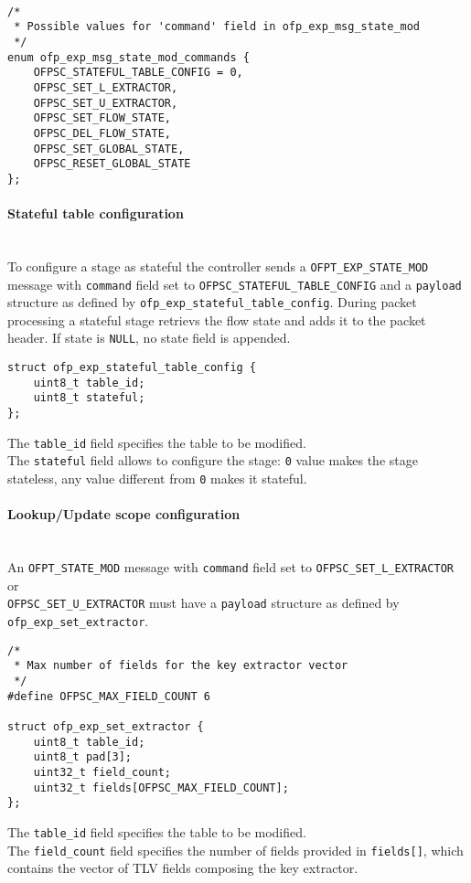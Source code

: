 \scriptsize\begin{verbatim}

/*
 * Possible values for 'command' field in ofp_exp_msg_state_mod
 */
enum ofp_exp_msg_state_mod_commands {
    OFPSC_STATEFUL_TABLE_CONFIG = 0,
    OFPSC_SET_L_EXTRACTOR,
    OFPSC_SET_U_EXTRACTOR,
    OFPSC_SET_FLOW_STATE,   
    OFPSC_DEL_FLOW_STATE,
    OFPSC_SET_GLOBAL_STATE,
    OFPSC_RESET_GLOBAL_STATE   
};
\end{verbatim}\normalsize

\paragraph{Stateful table configuration}\mbox{}\\
To configure a stage as stateful the controller sends a \texttt{OFPT\_EXP\_STATE\_MOD} message with \texttt{command} field set to \texttt{OFPSC\_STATEFUL\_TABLE\_CONFIG} and a \texttt{payload} structure as defined by \texttt{ofp\_exp\_stateful\_table\_config}. During packet processing a stateful stage retrievs the flow state and adds it to the packet header. If state is \texttt{NULL}, no state field is appended.

\scriptsize\begin{verbatim}
struct ofp_exp_stateful_table_config { 
    uint8_t table_id;
    uint8_t stateful;
};
\end{verbatim}\normalsize
The \texttt{table\_id} field specifies the table to be modified.
\\
The \texttt{stateful} field allows to configure the stage: \texttt{0} value makes the stage stateless, any value different from \texttt{0} makes it stateful.

\paragraph{Lookup/Update scope configuration}\mbox{}\\
An \texttt{OFPT\_STATE\_MOD} message with \texttt{command} field set to \texttt{OFPSC\_SET\_L\_EXTRACTOR} or
\\
\texttt{OFPSC\_SET\_U\_EXTRACTOR} must have a \texttt{payload} structure as defined by \texttt{ofp\_exp\_set\_extractor}.

\scriptsize\begin{verbatim}
/*
 * Max number of fields for the key extractor vector
 */
#define OFPSC_MAX_FIELD_COUNT 6

struct ofp_exp_set_extractor {
    uint8_t table_id;
    uint8_t pad[3];
    uint32_t field_count;
    uint32_t fields[OFPSC_MAX_FIELD_COUNT];
};
\end{verbatim}\normalsize
The \texttt{table\_id} field specifies the table to be modified.
\\
The \texttt{field\_count} field specifies the number of fields provided in \texttt{fields[]}, which contains the vector of TLV fields composing the key extractor.

